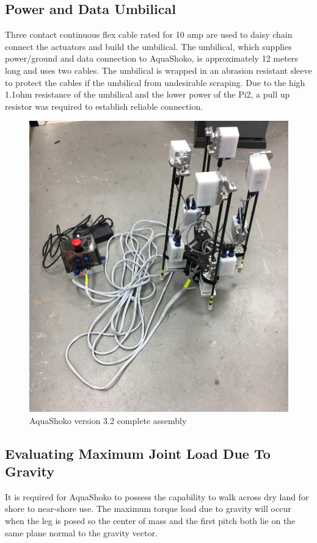 \subsection{Power and Data Umbilical}
Three contact continuous flex cable rated for 10 amp are used to daisy chain connect the actuators and build the umbilical. %
The umbilical, which supplies power/ground and data connection to AquaShoko, is approximately 12 meters long and uses two cables. The umbilical is wrapped in an abrasion resistant sleeve to protect the cables if the umbilical from undesirable scraping. Due to the high 1.1ohm resistance of the umbilical and the lower power of the Pi2, a pull up resistor was required to establish reliable connection. 

\begin{figure}[h]
\centering
\includegraphics[width=1.0\columnwidth]{./img/aquaShoko-v3dot2-photo-complete.JPG}
\caption{AquaShoko version 3.2 complete assembly }
\label{fig:shoko 3dot2}
\end{figure}

\subsection{Evaluating Maximum Joint Load Due To Gravity}
It is required for AquaShoko to possess the capability to walk across dry land for shore to near-shore use. The maximum torque load due to gravity will occur when the leg is posed so the center of mass and the first pitch both lie on the same plane normal to the gravity vector. 

